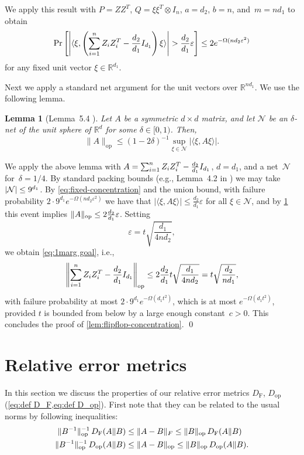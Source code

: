 \documentclass[aos]{imsart}
\newtheorem{lemma}[theorem]{Lemma}
\theoremstyle{definition}
\numberwithin{equation}{section}
\DeclareMathOperator{\op}{op}
\DeclarePairedDelimiter{\abs}{\lvert}{\rvert}
\DeclarePairedDelimiter{\norm}{\lVert}{\rVert}
\newcommand{\R}{{\mathbb{R}}}
\newcommand{\eps}{\varepsilon}
\newcommand{\DF}{D_{\operatorname{F}}}
\newcommand{\Dop}{D_{\operatorname{op}}}
\begin{document}
\begin{appendix}
We apply this result with $P = ZZ^T$, $Q = \xi \xi^T \otimes I_n$, $a = d_2$, $b = n$, and~$m = n d_1$ to obtain
\begin{align}\label{eq:fixed-concentration}
  \Pr\left[ \abs*{\langle \xi, \left( \sum_{i = 1}^n Z_i Z_i^{T} - \frac{d_2}{d_1} I_{d_1} \right) \xi \rangle} > \frac{d_2}{d_1} \eps \right]
\leq 2 e^{ - \Omega( n d_2 \eps^{2} ) }
\end{align}
for any fixed unit vector $\xi\in\R^{d_1}$.

Next we apply a standard net argument for the unit vectors over $\R^{nd_1}$.
We use the following lemma.

\begin{lemma}[Lemma~5.4 \cite{vershynin2010introduction}]\label{lem:versh-net}
Let $A$ be a symmetric $d\times d$ matrix, and let $\mathcal{N}$ be an $\delta$-net of the unit sphere of $\R^d$ for some $\delta \in [0,1)$.
Then,
$$\|A\|_{\op} \leq (1 - 2 \delta)^{-1} \sup_{\xi \in \mathcal{N}} | \langle \xi, A \xi \rangle|.$$
\end{lemma}
We apply the above lemma with $A = \sum_{i = 1}^n Z_i Z_i^{T} - \smash{\frac{d_2}{d_1}} I_{d_1}$, $d = d_1$, and a net~$\mathcal N$ for~$\delta = 1/4$.
By standard packing bounds (e.g., Lemma~4.2 in \cite{vershynin2010introduction}) we may take $\abs{\mathcal{N}} \leq 9^{d_1}$.
By \cref{eq:fixed-concentration} and the union bound, with failure probability $2 \cdot 9^{d_1} e^{- \Omega (n d_2 \eps^2)}$ we have that $|\langle \xi , A \xi \rangle| \leq \frac{d_2}{d_1} \eps$ for all $\xi \in \mathcal{N}$, and by \cref{lem:versh-net} this event implies $\norm{A}_{\op} \leq 2  \frac{d_2}{d_1} \eps$.
Setting
\[ \eps = t \sqrt{\frac{d_1}{4n d_2}}, \]
we obtain \cref{eq:1marg goal}, i.e.,
\begin{align*}
  \norm*{\sum_{i = 1}^n Z_i Z_i^{T} - \frac{d_2}{d_1} I_{d_1}}_{\op}
\leq 2 \frac{d_2}{d_1} t \sqrt{\frac{d_1}{4n d_2}}
= t \sqrt{\frac{d_2}{n d_1}},
\end{align*}
with failure probability at most $2 \cdot 9^{d_1} e^{- \Omega(d_1 t^2)}$, which is at most $e^{ - \Omega(d_1 t^2)}$, provided $t$ is bounded from below by a large enough constant~$c>0$.
This concludes the proof of \cref{lem:flipflop-concentration}. \qed

\section{Relative error metrics}\label{sec:rel-error}
In this section we discuss the properties of our relative error metrics $\DF$, $\Dop$ (\cref{eq:def D_F,eq:def D_op}).
First note that they can be related to the usual norms by following inequalities:
\begin{align}
\label{eq:D_F rel vs abs}
\|B^{-1}\|_{\op}^{-1} \, \DF(A\Vert B)&\leq \norm{A - B}_F \leq \norm{B}_{\op} \, \DF(A\Vert B)\\
\label{eq:D_op rel vs abs}
\|B^{-1}\|_{\op}^{-1} \, \Dop(A\Vert B) &\leq \norm{A  - B}_{\op} \leq \norm{B}_{\op} \, \Dop(A \Vert B).
\end{align}


\end{appendix}
\end{document}
